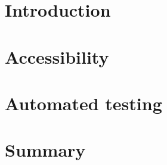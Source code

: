 \documentclass{master_thesis}
\begin{document}
\section{Introduction}

\section{Accessibility}



\section{Automated testing}


\section{Summary}
\end{document}

